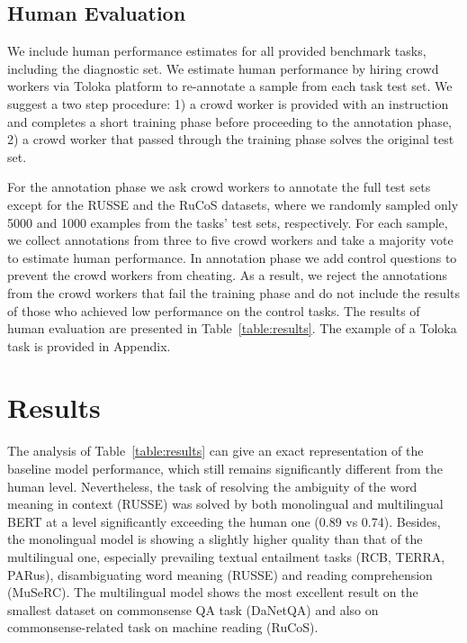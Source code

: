 \documentclass[11pt,a4paper]{article}
\begin{document}
\subsection{Human Evaluation} 

We include human performance estimates for all provided benchmark tasks, including the diagnostic set. We estimate human performance by hiring crowd workers via Toloka platform to re-annotate a sample from each task test set. We suggest a two step procedure: 1) a crowd worker is provided with an instruction and completes a short training phase before proceeding to the annotation phase, 2) a crowd worker that passed through the training phase solves the original test set.

For the annotation phase we ask crowd workers to annotate the full test sets except for the RUSSE and the RuCoS datasets, where we randomly sampled only 5000 and 1000 examples from the tasks' test sets, respectively. For each sample, we collect annotations from three to five crowd workers and take a majority vote to estimate human performance. In annotation phase we add control questions to prevent the crowd workers from cheating. As a result, we reject the annotations from the crowd workers that fail the training phase and do not include the results of those who achieved low performance on the control tasks.
The results of human evaluation are presented in Table~\ref{table:results}. The example of a Toloka task is provided in Appendix.




\section{Results}

The analysis of Table~\ref{table:results} can give an exact representation of the baseline model performance, which still remains significantly different from the human level. Nevertheless, the task of resolving the ambiguity of the word meaning in context (RUSSE) was solved by both monolingual and multilingual BERT at a level significantly exceeding the human one (0.89 vs 0.74). Besides, the monolingual model is showing a slightly higher quality than that of the multilingual one, especially prevailing textual entailment tasks (RCB, TERRA, PARus), disambiguating word meaning (RUSSE) and reading comprehension (MuSeRC). The multilingual model shows the most excellent result on the smallest dataset on commonsense QA task (DaNetQA) and also on commonsense-related task on machine reading (RuCoS).
\end{document}
